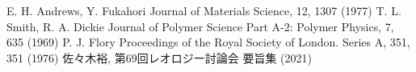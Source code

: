 \documentclass[uplatex,dvipdfmx,a4paper,10pt]{jsarticle}
\begin{document}
\vspace{-7mm}
\begin{thebibliography}{99}
     E. H. Andrews, Y. Fukahori Journal of Materials Science, 12, 1307 (1977)
     T. L. Smith, R. A. Dickie Journal of Polymer Science Part A-2: Polymer Physics, 7, 635 (1969)
     P. J. Flory Proceedings of the Royal Society of London. Series A, 351, 351 (1976)
     佐々木裕, 第69回レオロジー討論会 要旨集 (2021)
\end{thebibliography}
\end{document}
